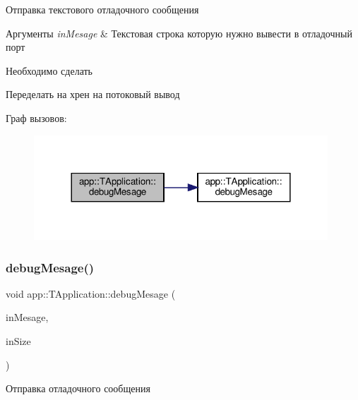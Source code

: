 Отправка текстового отладочного сообщения 


\begin{DoxyParams}{Аргументы}
{\em in\+Mesage} & Текстовая строка которую нужно вывести в отладочный порт \\
\hline
\end{DoxyParams}
\begin{DoxyRefDesc}{Необходимо сделать}
\item[\hyperlink{todo__todo000001}{Необходимо сделать}]Переделать на хрен на потоковый вывод \end{DoxyRefDesc}
Граф вызовов\+:\nopagebreak
\begin{figure}[H]
\begin{center}
\leavevmode
\includegraphics[width=312pt]{classapp_1_1_t_application_a2ac87a63360e7974afe2249f7b7e54cd_cgraph}
\end{center}
\end{figure}
\mbox{\label{classapp_1_1_t_application_a136a0f8acf017467e50018c00bad3d24}} 
\subsubsection{\texorpdfstring{debug\+Mesage()}{debugMesage()}\hspace{0.1cm}{\footnotesize\ttfamily [2/4]}}
{\footnotesize\ttfamily void app\+::\+T\+Application\+::debug\+Mesage (\begin{DoxyParamCaption}\item[{const char $\ast$}]{in\+Mesage,  }\item[{const std\+::size\+\_\+t}]{in\+Size }\end{DoxyParamCaption})}



Отправка отладочного сообщения 

